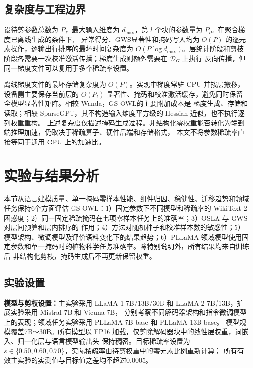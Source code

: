\documentclass[UTF8,fontset=fandol]{ctexart}
\newcommand{\method}{GS-OWL}
\newcommand{\gws}{\textsc{GWS}}
\begin{document}
\subsection{复杂度与工程边界}

设待剪参数总数为 $P$，最大输入维度为 $d_{\max}$，第 $l$ 个块的参数量为 $P_l$。在聚合梯度已离线生成的条件下，
异常得分、\gws 显著性和掩码写入均为 $O(P)$ 的逐元素操作，逐输出行排序的最坏时间复杂度为
$O(P\log d_{\max})$。层统计阶段和剪枝阶段各需要一次校准激活传播；梯度生成则额外需要在 $\mathcal D_G$ 上执行
反向传播，但同一梯度文件可以复用于多个稀疏率设置。

离线梯度文件的最坏存储复杂度为 $O(P)$。实现中梯度常驻 CPU 并按层搬移，设备侧主要保存当前层的
$O(P_l)$ 显著性、掩码和校准激活缓存，避免同时保留全模型显著性矩阵。相较 Wanda，\method 的主要附加成本是
梯度生成、存储和读取；相较 SparseGPT，其不构造输入维度平方级的 Hessian 近似，也不执行逐列权重重构。
上述复杂度仅描述掩码生成过程。非结构化零权重能否转化为端到端推理加速，仍取决于稀疏算子、硬件后端和存储格式，
本文不将参数稀疏率直接等同于通用 GPU 上的加速比。

\section{实验与结果分析}

本节从语言建模质量、单一掩码零样本性能、组件归因、稳健性、迁移趋势和领域任务保持6个方面评估 \method：1）固定参数下不同模型和稀疏率的
WikiText-2 困惑度；2）同一固定稀疏掩码在七项零样本任务上的准确率；3）OSLA 与 GWS 对层间预算和层内排序的
作用；4）方法对随机种子和校准样本数的敏感性；5）模型架构、微调模型及评价语料变化下的结果趋势；6）PLLaMA
领域模型使用固定参数和单一掩码时的植物科学任务准确率。除特别说明外，所有结果均来自训练后
非结构化剪枝，掩码生成后不再更新保留权重。

\subsection{实验设置}

\textbf{模型与剪枝设置：}主实验采用 LLaMA-1-7B/13B/30B 和 LLaMA-2-7B/13B，扩展实验采用 Mistral-7B 和 Vicuna-7B，
分别考察不同解码器架构和指令微调模型上的表现；领域任务实验采用 PLLaMA-7B-base 和 PLLaMA-13B-base。
模型规模覆盖7B～30B。所有模型以 FP16 加载，仅剪除解码器块中的线性层权重，词嵌入、归一化层与语言模型输出头
保持稠密。目标稀疏率设置为 $s\in\{0.50,0.60,0.70\}$，实际稀疏率由待剪权重中的零元素比例重新计算；
所有有效主实验的实测值与目标值之差均不超过0.0005。
\end{document}
